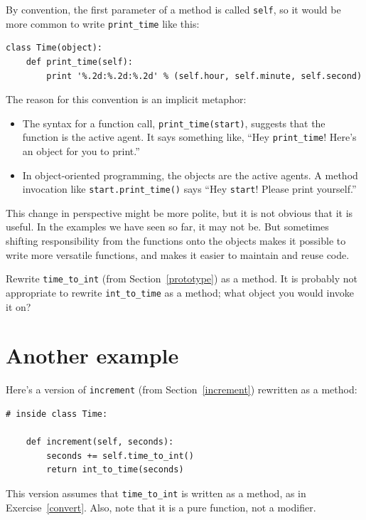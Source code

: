 \documentclass[10pt]{book}
\begin{document}
\begin{CJK}{UTF8}{gbsn}
By convention, the first parameter of a method is
called {\tt self}, so it would be more common to write
\verb"print_time" like this:

\begin{verbatim}
class Time(object):
    def print_time(self):
        print '%.2d:%.2d:%.2d' % (self.hour, self.minute, self.second)
\end{verbatim}
%
The reason for this convention is an implicit metaphor:

\begin{itemize}

\item The syntax for a function call, \verb"print_time(start)",
  suggests that the function is the active agent.  It says something
  like, ``Hey \verb"print_time"!  Here's an object for you to print.''

\item In object-oriented programming, the objects are the active
  agents.  A method invocation like \verb"start.print_time()" says
  ``Hey {\tt start}!  Please print yourself.''

\end{itemize}

This change in perspective might be more polite, but it is not obvious
that it is useful.  In the examples we have seen so far, it may not
be.  But sometimes shifting responsibility from the functions onto the
objects makes it possible to write more versatile functions, and makes
it easier to maintain and reuse code.

\begin{exercise}
\label{convert}

Rewrite \verb"time_to_int" (from Section~\ref{prototype}) as a method.
It is probably not appropriate to rewrite \verb"int_to_time" as a
method; what object you would invoke it on?

\end{exercise}


\section{Another example}

Here's a version of {\tt increment} (from Section~\ref{increment})
rewritten as a method:

\begin{verbatim}
# inside class Time:

    def increment(self, seconds):
        seconds += self.time_to_int()
        return int_to_time(seconds)
\end{verbatim}
%
This version assumes that \verb"time_to_int" is written
as a method, as in Exercise~\ref{convert}.  Also, note that
it is a pure function, not a modifier.


\end{CJK}
\end{document}
